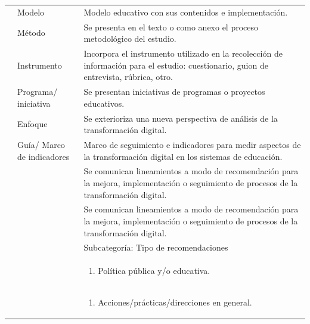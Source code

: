 \begin{longtable}{
    >{\raggedright\arraybackslash}p{}
    >{\raggedright\arraybackslash}p{} 
    >{\raggedright\arraybackslash}p{}}
        \multirow{9}{*}{\begin{minipage}{\textwidth-0.125\textwidth-0.65\textwidth} Tipo de aporte\end{minipage}} & Modelo & Modelo educativo con
        sus contenidos e implementación. \\
        & Método & Se presenta en el texto o como anexo el proceso metodológico
        del estudio. \\
        & Instrumento & Incorpora el instrumento utilizado en la recolección de
        información para el estudio: cuestionario, guion de entrevista, rúbrica,
        otro. \\
        & Programa/ iniciativa & Se presentan iniciativas de programas o
        proyectos educativos. \\
        & Enfoque & Se exterioriza una nueva perspectiva de análisis de la
        transformación digital. \\
        & Guía/ Marco de indicadores & Marco de seguimiento e indicadores para medir
        aspectos de la transformación digital en los sistemas de educación. \\
        
        & \multirow{3}{*}{\begin{minipage}{0.125\textwidth} Recomendaciones \end{minipage}} & Se comunican lineamientos a modo de recomendación
        para la mejora, implementación o seguimiento de procesos de la
        transformación digital. \\
        & & Se comunican lineamientos a modo de recomendación para la mejora, implementación o seguimiento de procesos de la transformación digital. \\
        && Subcategoría: Tipo de recomendaciones \\
        && \begin{enumerate}
            \def\labelenumi{\alph{enumi})}
            \item Política pública y/o educativa.
        \end{enumerate} \\
        && \begin{enumerate}
            \def\labelenumi{\alph{enumi})}
            \setcounter{enumi}{1}
            \item Acciones/prácticas/direcciones en general.
        \end{enumerate} \\
        

\end{longtable}
